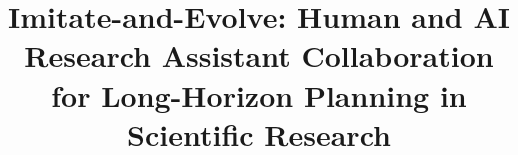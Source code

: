 \documentclass[manuscript,review,anonymous]{acmart}
\begin{document}
\title{Imitate-and-Evolve: Human and AI Research Assistant Collaboration for Long-Horizon Planning in Scientific Research}









\end{document}

